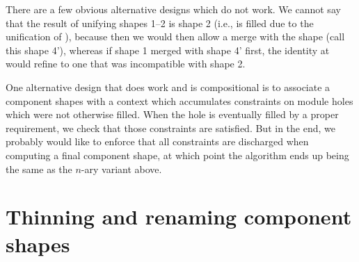 There are a few obvious alternative designs which do not work.
We cannot say that the result of unifying shapes 1--2 is shape 2 (i.e.,
 is filled due to the unification of ), because
then we would then allow a merge with the shape  (call this
shape 4'),
whereas if shape 1 merged with shape 4' first, the identity at  would refine
to one that was incompatible with shape 2.

One alternative design that does work and is compositional is to associate a
component shapes with a context which accumulates constraints on module
holes which were not otherwise filled.  When the hole is eventually filled
by a proper requirement, we check that those constraints are satisfied.
But in the end, we probably would like to enforce that all constraints are
discharged when computing a final component shape, at which point the algorithm
ends up being the same as the $n$-ary variant above.

\section{Thinning and renaming component shapes}




